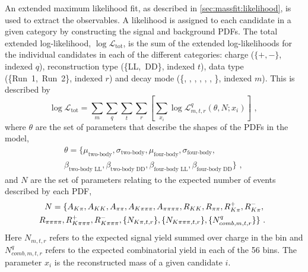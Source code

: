 An extended maximum likelihood fit, as described in \sect\ref{sec:massfit:likelihood}, is used to extract the \CP observables. A likelihood is assigned to each candidate in a given category by constructing the signal and background PDFs. The total extended log-likelihood, $\log\mathcal{L}_{\text{tot}}$, is the sum of the extended log-likelihoods for the individual candidates in each of the different categories: \B charge (\mbox{$\{+,-\}$}, indexed $q$), \KS reconstruction type (\mbox{\{LL, DD\}}, indexed $t$), data type (\mbox{\{Run 1, Run 2\}}, indexed $r$) and \Dz decay mode (\{\Km\pip, \Km\Kp, \pim\pip, \pim\Kp, \Km\pip\pim\pip, \pim\pip\pim\pip, \pim\Kp\pim\pip\}, indexed $m$). This is described by
\begin{equation}
\log\mathcal{L}_{\text{tot}} =  \sum_{m}\sum_{q}\sum_{t}\sum_{r}\left[\sum_{x_i} \log{\mathcal{L}}_{m,t,r}^q\left( \theta, N; x_i \right) \right] \text{ , }
\end{equation}
where $\theta$ are the set of parameters that describe the shapes of the PDFs in the model,
\begin{multline}
\theta = \{\mu_\text{two-body}, \sigma_\text{two-body}, \mu_\text{four-body}, \sigma_\text{four-body}, \\ \beta_\text{two-body LL}, \beta_\text{two-body DD}, \beta_\text{four-body LL}, \beta_\text{four-body DD}\} \text{ , }
\end{multline} 
and $N$ are the set of parameters relating to the expected number of events described by each PDF, 
\begin{multline}
N = \{A_{K\pi}, A_{KK}, A_{\pi\pi}, A_{K\pi\pi\pi}, A_{\pi\pi\pi\pi}, R_{KK}, R_{\pi\pi}, R^+_{K\pi}, R^-_{K\pi}, \\ R_{\pi\pi\pi\pi}, R^+_{K\pi\pi\pi}, R^-_{K\pi\pi\pi}, \{N_{K\pi,t,r}\}, \{N_{K\pi\pi\pi,t,r}\}, \{N_{comb,m,t,r}^{q}\}\} \text{ . }
\end{multline}
Here $N_{m,t,r}$ refers to the expected signal yield summed over charge in the bin and $N_{comb,m,t,r}^q$ refers to the expected combinatorial yield in each of the 56 bins. The parameter $x_i$ is  the reconstructed mass of a given candidate $i$.

